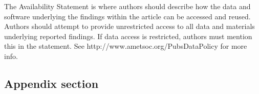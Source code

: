 \documentclass{ametsocV6.2}
\begin{document}
% 
%
\availstatement
  The Availability Statement is where authors should describe how the data and software  
  underlying the findings within the article can be accessed and reused. Authors should 
  attempt to provide unrestricted access to all data and materials underlying reported findings. 
  If data access is restricted, authors must mention this in the statement. See
  {http://www.ametsoc.org/PubsDataPolicy} for more info.









%



\appendix[A] 


\subsection*{Appendix section}
\end{document}

